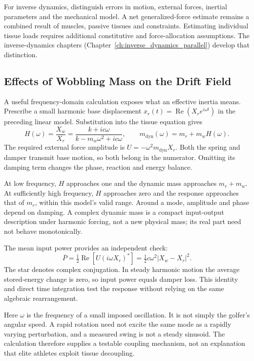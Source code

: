 For inverse dynamics, distinguish errors in motion, external forces, inertial parameters and the mechanical model. A net generalized-force estimate remains a combined result of muscles, passive tissues and constraints. Estimating individual tissue loads requires additional constitutive and force-allocation assumptions. The inverse-dynamics chapters (Chapter~\ref{ch:inverse_dynamics_parallel}) develop that distinction.

\subsection{Effects of Wobbling Mass on the Drift Field}

A useful frequency-domain calculation exposes what an effective inertia means. Prescribe a small harmonic base displacement $x_r(t)=\operatorname{Re}(X_r e^{i\omega t})$ in the preceding linear model. Substitution into the tissue equation gives
\[
H(\omega)=\frac{X_w}{X_r}
=\frac{k+ic\omega}{k-m_w\omega^2+ic\omega},
\qquad
m_{\mathrm{dyn}}(\omega)=m_r+m_wH(\omega).
\]
The required external force amplitude is $U=-\omega^2m_{\mathrm{dyn}}X_r$. Both the spring and damper transmit base motion, so both belong in the numerator. Omitting its damping term changes the phase, reaction and energy balance.

At low frequency, $H$ approaches one and the dynamic mass approaches $m_r+m_w$. At sufficiently high frequency, $H$ approaches zero and the response approaches that of $m_r$, within this model's valid range. Around a mode, amplitude and phase depend on damping. A complex dynamic mass is a compact input-output description under harmonic forcing, not a new physical mass; its real part need not behave monotonically.

The mean input power provides an independent check:
\[
\overline P
=\tfrac12\operatorname{Re}\!\left[U(i\omega X_r)^*\right]
=\tfrac12c\omega^2|X_w-X_r|^2.
\]
The star denotes complex conjugation. In steady harmonic motion the average stored-energy change is zero, so input power equals damper loss. This identity and direct time integration test the response without relying on the same algebraic rearrangement.

Here $\omega$ is the frequency of a small imposed oscillation. It is not simply the golfer's angular speed. A rapid rotation need not excite the same mode as a rapidly varying perturbation, and a measured swing is not a steady sinusoid. The calculation therefore supplies a testable coupling mechanism, not an explanation that elite athletes exploit tissue decoupling.

